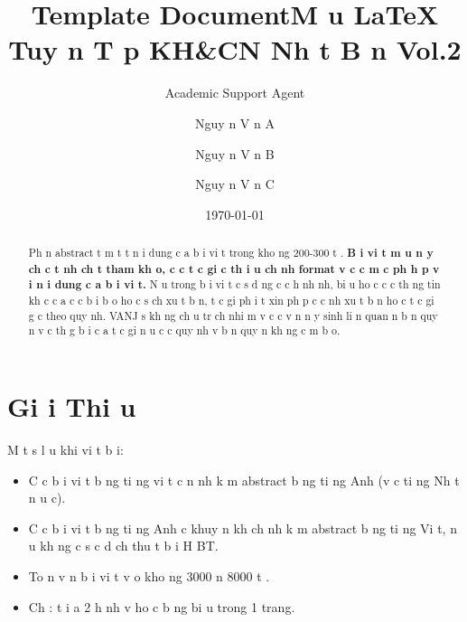 \documentclass{article}
\title{Template Document}
\author{Academic Support Agent}
\date{\today}
\begin{document}
\maketitle

\title{M u LaTeX Tuy n T p KH\&CN Nh t B n Vol.2}
%
\author{Nguy n V n A \and
Nguy n V n B \and
Nguy n V n C}
%
%
\maketitle

\begin{abstract}
Ph n abstract t m t t n i dung c a b i vi t trong kho ng 200-300 t . \textbf{B i vi t m u n y ch  c  t nh ch t tham kh o, c c t c gi  c  th   i u ch nh format v  c c   m c ph  h p v i n i dung c a b i vi t.} N u trong b i vi t c  s  d ng c c h nh  nh, bi u   ho c c c th ng tin kh c c a c c b i b o ho c s ch   xu t b n, t c gi  ph i t  xin ph p c c nh  xu t b n ho c t c gi  g c theo quy  nh. VANJ s  kh ng ch u tr ch nhi m v  c c v n   n y sinh li n quan  n b n quy n v  c  th  g  b i c a t c gi  n u c c quy  nh v  b n quy n kh ng  c  m b o.

\end{abstract}

\section{Gi i Thi u}
M t s  l u   khi vi t b i:
\begin{itemize}
    \item C c b i vi t b ng ti ng vi t c n  nh k m abstract b ng ti ng Anh (v  c  ti ng Nh t n u  c).
    \item C c b i vi t b ng ti ng Anh  c khuy n kh ch  nh k m abstract b ng ti ng Vi t, n u kh ng c  s   c d ch thu t b i H BT.
    \item To n v n b i vi t v o kho ng 3000  n 8000 t .
    \item Ch   : t i  a 2 h nh v  ho c b ng bi u trong 1 trang.
\end{itemize}
\end{document}
